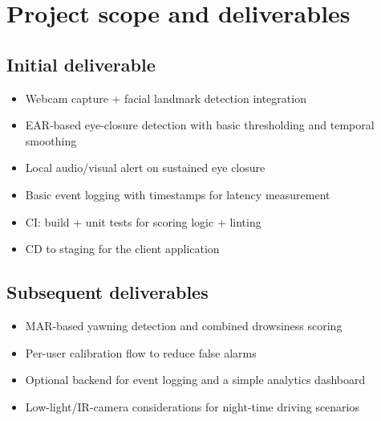 \documentclass[11pt,a4paper]{article}
\begin{document}
\section{Project scope and deliverables}
\subsection{Initial deliverable}
\begin{itemize}[leftmargin=0.7cm]
    \item Webcam capture + facial landmark detection integration
    \item EAR-based eye-closure detection with basic thresholding and temporal smoothing
    \item Local audio/visual alert on sustained eye closure
    \item Basic event logging with timestamps for latency measurement
    \item CI: build + unit tests for scoring logic + linting
    \item CD to staging for the client application
\end{itemize}

\subsection{Subsequent deliverables}
\begin{itemize}[leftmargin=0.7cm]
    \item MAR-based yawning detection and combined drowsiness scoring
    \item Per-user calibration flow to reduce false alarms
    \item Optional backend for event logging and a simple analytics dashboard
    \item Low-light/IR-camera considerations for night-time driving scenarios
\end{itemize}
\end{document}
